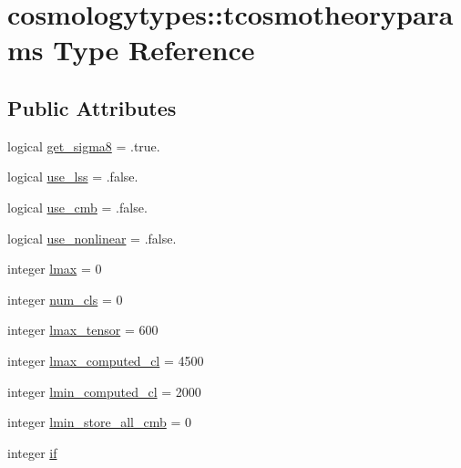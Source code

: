 \hypertarget{structcosmologytypes_1_1tcosmotheoryparams}{}\section{cosmologytypes\+:\+:tcosmotheoryparams Type Reference}
\label{structcosmologytypes_1_1tcosmotheoryparams}
\subsection*{Public Attributes}
\begin{DoxyCompactItemize}
\item 
logical \mbox{\hyperlink{structcosmologytypes_1_1tcosmotheoryparams_a84d09941e0d7234617dcad6521707e6f}{get\+\_\+sigma8}} = .true.
\item 
logical \mbox{\hyperlink{structcosmologytypes_1_1tcosmotheoryparams_a756329565157fc0a9de09c540ad47879}{use\+\_\+lss}} = .false.
\item 
logical \mbox{\hyperlink{structcosmologytypes_1_1tcosmotheoryparams_a82fd7bc618585833a553c78fa7ea61b6}{use\+\_\+cmb}} = .false.
\item 
logical \mbox{\hyperlink{structcosmologytypes_1_1tcosmotheoryparams_abe50130ccf9ca55587f3724f93418796}{use\+\_\+nonlinear}} = .false.
\item 
integer \mbox{\hyperlink{structcosmologytypes_1_1tcosmotheoryparams_affbe31c5915985183ec17db5daa9931a}{lmax}} = 0
\item 
integer \mbox{\hyperlink{structcosmologytypes_1_1tcosmotheoryparams_a9964fea8bc34fd7b3e3446818d393653}{num\+\_\+cls}} = 0
\item 
integer \mbox{\hyperlink{structcosmologytypes_1_1tcosmotheoryparams_a5e63d4564bf8f492ad52c91c79b9013b}{lmax\+\_\+tensor}} = 600
\item 
integer \mbox{\hyperlink{structcosmologytypes_1_1tcosmotheoryparams_a92bfdc1b83112a9bb00cbefb83356cdd}{lmax\+\_\+computed\+\_\+cl}} = 4500
\item 
integer \mbox{\hyperlink{structcosmologytypes_1_1tcosmotheoryparams_a30201aecfe55be0b86e64f18758c6d00}{lmin\+\_\+computed\+\_\+cl}} = 2000
\item 
integer \mbox{\hyperlink{structcosmologytypes_1_1tcosmotheoryparams_a95706330b84037877ed82c988a9dae14}{lmin\+\_\+store\+\_\+all\+\_\+cmb}} = 0
\item 
integer \mbox{\hyperlink{structcosmologytypes_1_1tcosmotheoryparams_adf626c7a07fff973c1f5e34a5597a798}{if}}

\end{DoxyCompactItemize}
